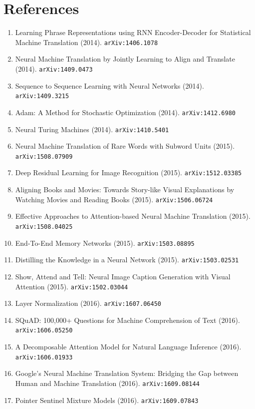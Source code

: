 \documentclass[11pt]{article}
\begin{document}
\section*{References}
\begin{enumerate}\small
  \item Learning Phrase Representations using RNN Encoder-Decoder for
  Statistical Machine Translation (2014). \texttt{arXiv:1406.1078}
  \item Neural Machine Translation by Jointly Learning to Align and Translate (2014). \texttt{arXiv:1409.0473}
  \item Sequence to Sequence Learning with Neural Networks (2014). \texttt{arXiv:1409.3215}
  \item Adam: A Method for Stochastic Optimization (2014). \texttt{arXiv:1412.6980}
  \item Neural Turing Machines (2014). \texttt{arXiv:1410.5401}
  \item Neural Machine Translation of Rare Words with Subword Units (2015). \texttt{arXiv:1508.07909}
  \item Deep Residual Learning for Image Recognition (2015). \texttt{arXiv:1512.03385}
  \item Aligning Books and Movies: Towards Story-like Visual Explanations by
  Watching Movies and Reading Books (2015). \texttt{arXiv:1506.06724}
  \item Effective Approaches to Attention-based Neural Machine Translation (2015). \texttt{arXiv:1508.04025}
  \item End-To-End Memory Networks (2015). \texttt{arXiv:1503.08895}
  \item Distilling the Knowledge in a Neural Network (2015). \texttt{arXiv:1503.02531}
  \item Show, Attend and Tell: Neural Image Caption Generation with Visual
  Attention (2015). \texttt{arXiv:1502.03044}
  \item Layer Normalization (2016). \texttt{arXiv:1607.06450}
  \item SQuAD: 100,000+ Questions for Machine Comprehension of Text (2016). \texttt{arXiv:1606.05250}
  \item A Decomposable Attention Model for Natural Language Inference (2016). \texttt{arXiv:1606.01933}
  \item Google's Neural Machine Translation System: Bridging the Gap between
  Human and Machine Translation (2016). \texttt{arXiv:1609.08144}
  \item Pointer Sentinel Mixture Models (2016). \texttt{arXiv:1609.07843}

\end{enumerate}
\end{document}
